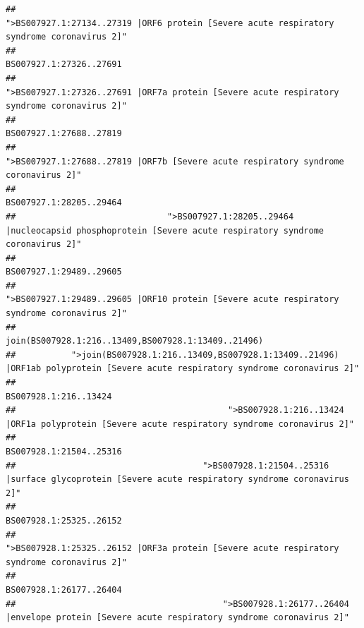 \documentclass[
]{article}
\begin{document}
\begin{verbatim}
##                                             ">BS007927.1:27134..27319 |ORF6 protein [Severe acute respiratory syndrome coronavirus 2]" 
##                                                                                                                BS007927.1:27326..27691 
##                                            ">BS007927.1:27326..27691 |ORF7a protein [Severe acute respiratory syndrome coronavirus 2]" 
##                                                                                                                BS007927.1:27688..27819 
##                                                    ">BS007927.1:27688..27819 |ORF7b [Severe acute respiratory syndrome coronavirus 2]" 
##                                                                                                                BS007927.1:28205..29464 
##                              ">BS007927.1:28205..29464 |nucleocapsid phosphoprotein [Severe acute respiratory syndrome coronavirus 2]" 
##                                                                                                                BS007927.1:29489..29605 
##                                            ">BS007927.1:29489..29605 |ORF10 protein [Severe acute respiratory syndrome coronavirus 2]" 
##                                                                                    join(BS007928.1:216..13409,BS007928.1:13409..21496) 
##           ">join(BS007928.1:216..13409,BS007928.1:13409..21496) |ORF1ab polyprotein [Severe acute respiratory syndrome coronavirus 2]" 
##                                                                                                                  BS007928.1:216..13424 
##                                          ">BS007928.1:216..13424 |ORF1a polyprotein [Severe acute respiratory syndrome coronavirus 2]" 
##                                                                                                                BS007928.1:21504..25316 
##                                     ">BS007928.1:21504..25316 |surface glycoprotein [Severe acute respiratory syndrome coronavirus 2]" 
##                                                                                                                BS007928.1:25325..26152 
##                                            ">BS007928.1:25325..26152 |ORF3a protein [Severe acute respiratory syndrome coronavirus 2]" 
##                                                                                                                BS007928.1:26177..26404 
##                                         ">BS007928.1:26177..26404 |envelope protein [Severe acute respiratory syndrome coronavirus 2]" 

\end{verbatim}
\end{document}
